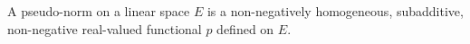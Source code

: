 A pseudo-norm on a linear space $E$ is a non-negatively homogeneous, subadditive, non-negative real-valued functional $p$ defined on $E$.
